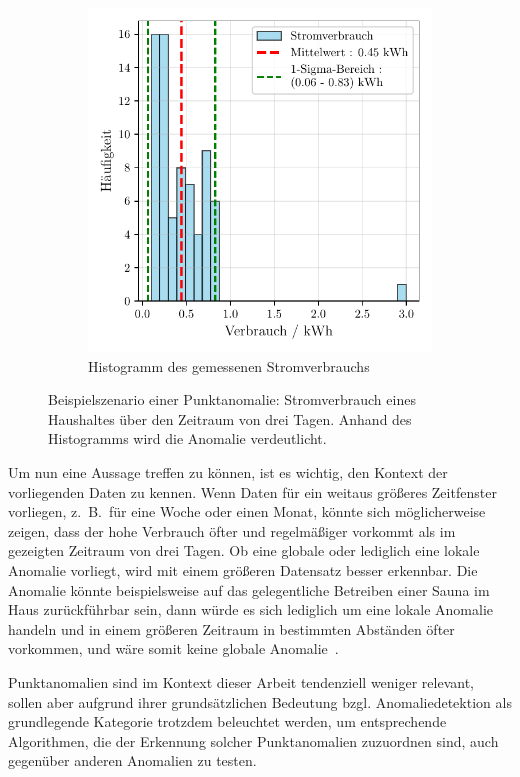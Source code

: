 \begin{figure}[H]
\begin{subfigure}[b]{0.49\linewidth}
        \includegraphics[width=\linewidth]{ch4_anomalien/abbildungen/punktanomalie_hist.pdf}
        \caption{\centering Histogramm des gemessenen Stromverbrauchs}\label{subfig:smartmeter_histogramm}
    \end{subfigure}
    \caption{\centering Beispielszenario einer Punktanomalie: Stromverbrauch eines Haushaltes über den Zeitraum von
    drei Tagen. Anhand des Histogramms wird die Anomalie verdeutlicht.}\label{fig:punktanomalie}
\end{figure}

Um nun eine Aussage treffen zu können, ist es wichtig, den Kontext der vorliegenden Daten zu kennen. Wenn Daten für ein weitaus größeres
Zeitfenster vorliegen, z.~B.~für eine Woche oder einen Monat, könnte sich möglicherweise zeigen, dass der hohe Verbrauch öfter und
regelmäßiger vorkommt als im gezeigten Zeitraum von drei Tagen. Ob eine globale oder lediglich eine lokale Anomalie vorliegt, wird
mit einem größeren Datensatz besser erkennbar. Die Anomalie könnte beispielsweise auf das gelegentliche Betreiben einer Sauna im Haus
zurückführbar sein, dann würde es sich lediglich um eine lokale Anomalie handeln und in einem größeren Zeitraum in bestimmten Abständen
öfter vorkommen, und wäre somit keine globale Anomalie~\Cite[Kap.~10]{Tan2014}.

Punktanomalien sind im Kontext dieser Arbeit tendenziell weniger relevant, sollen aber aufgrund ihrer grundsätzlichen Bedeutung bzgl.
Anomaliedetektion als grundlegende Kategorie trotzdem beleuchtet werden, um entsprechende Algorithmen, die der Erkennung solcher
Punktanomalien zuzuordnen sind, auch gegenüber anderen Anomalien zu testen.

